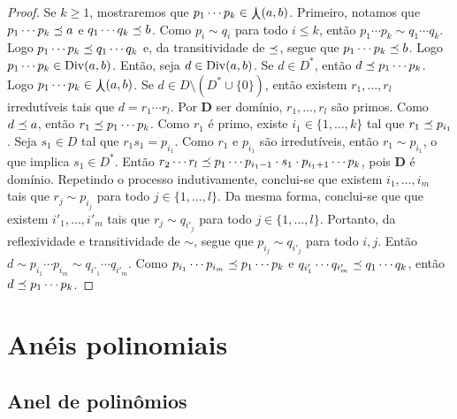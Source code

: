 \begin{proof}
Se $k \geq 1$, mostraremos que $p_1 \cdots p_k \in \mathop{\bigcurlywedge}(a,b)$. Primeiro, notamos que $p_1 \cdots p_k\allowbreak \preceq a$ e $q_1 \cdots q_k \preceq b$. Como $p_i \sim q_i$ para todo $i \leq k$, então $p_1 \cdots p_k \sim q_1 \cdots q_k$. Logo $p_1 \cdots p_k \preceq q_1 \cdots q_k$ e, da transitividade de $\preceq$, segue que $p_1 \cdots p_k \preceq b$. Logo $p_1 \cdots p_k \in \operatorname{Div}(a,b)$. Então, seja $d \in \operatorname{Div}(a,b)$. Se $d \in D^*$, então $d \preceq p_1 \cdots p_k$. Logo $p_1 \cdots p_k \in \mathop{\bigcurlywedge}(a,b)$. Se $d \in D \setminus (D^* \cup \{0\})$, então existem $r_1,\ldots,r_l$ irredutíveis tais que $d = r_1 \cdots r_l$. Por $\bm D$ ser domínio, $r_1,\ldots,r_l$ são primos. Como $d \preceq a$, então $r_1 \preceq p_1 \cdots p_k$. Como $r_1$ é primo, existe $i_1 \in \{1,\ldots,k\}$ tal que $r_1 \preceq p_{i_1}$. Seja $s_1 \in D$ tal que $r_1s_1 = p_{i_1}$. Como $r_1$ e $p_{i_1}$ são irredutíveis, então $r_1 \sim p_{i_1}$, o que implica $s_1 \in D^*$. Então $r_2 \cdots r_l \preceq p_1 \cdots p_{i_1-1} \cdot s_1 \cdot p_{i_1+1} \cdots p_k$, pois $\bm D$ é domínio. Repetindo o processo indutivamente, conclui-se que existem $i_1, \ldots,i_m$ tais que $r_j \sim p_{i_j}$ para todo $j \in \{1,\ldots,l\}$.
Da mesma forma, conclui-se que que existem $i'_1, \ldots,i'_m$ tais que $r_j \sim q_{i'_j}$ para todo $j \in \{1,\ldots,l\}$. Portanto, da reflexividade e transitividade de $\sim$, segue que $p_{i_j} \sim q_{i'_j}$ para todo $i,j$. Então $d \sim p_{i_1} \cdots p_{i_m} \sim q_{i'_1} \cdots q_{i'_m}$. Como $p_{i_1} \cdots p_{i_m} \preceq p_1 \cdots p_k$ e $q_{i'_1} \cdots q_{i'_m} \preceq q_1 \cdots q_k$, então $d \preceq p_1 \cdots p_k$.
\end{proof}







\section{Anéis polinomiais}

\subsection{Anel de polinômios}

